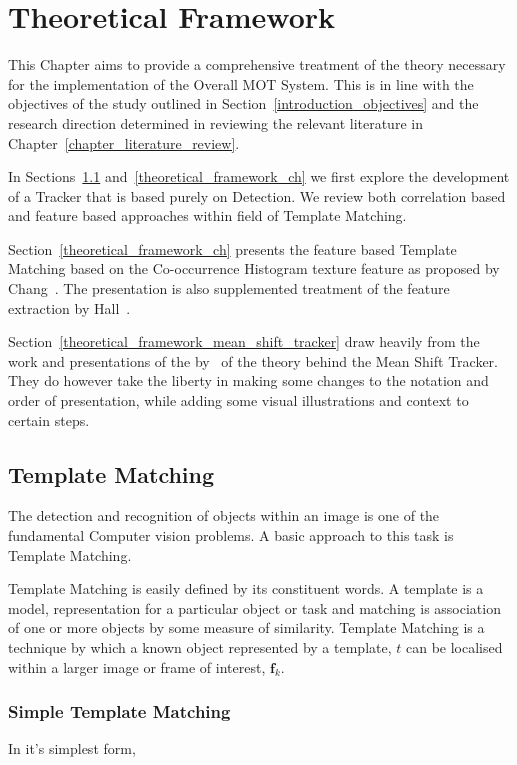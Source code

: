 \chapter{Theoretical Framework}\label{chapter_theoretical_framework}

This Chapter aims to provide a comprehensive treatment of the theory necessary
for the implementation of the Overall MOT System. This is in line with the
objectives of the study outlined in Section~\ref{introduction_objectives} and
the research direction determined in reviewing the relevant literature in
Chapter~\ref{chapter_literature_review}.

In Sections~\ref{theoretical_framework_tm} and~\ref{theoretical_framework_ch} we first
explore the development of a Tracker that is based purely on Detection. We
review both correlation based and feature based approaches within field of Template Matching.

Section~\ref{theoretical_framework_ch} presents the feature based Template
Matching based on the Co-occurrence Histogram texture feature as proposed by
Chang~\cite{Chang1999}. The presentation is also supplemented treatment of the
feature extraction by Hall~\cite{Hall-beyer2018}.

Section~\ref{theoretical_framework_mean_shift_tracker} draw heavily from the
work and presentations of the by~\cite{Comaniciu2002, Comaniciu2003,
Shah2011} of the theory behind the Mean Shift Tracker. They do however take the
liberty in making some changes to the notation and order of presentation, while
adding some visual illustrations and
context to certain steps. 


\section{Template Matching}\label{theoretical_framework_tm}
The detection and recognition of objects within an image is one of the
fundamental Computer vision problems. A basic approach to this task is Template
Matching.

Template Matching is easily defined by its constituent words. A template is a
model, representation for a particular object or task and matching is
association of one or more objects by some measure of similarity. Template
Matching is a technique by which a known object represented by a template, $t$
can be localised within a larger image or frame of interest, $\mathbf{f}_k$.

\subsection{Simple Template Matching}\label{theoretical_framework_simple_tm}
In it's simplest form, 

